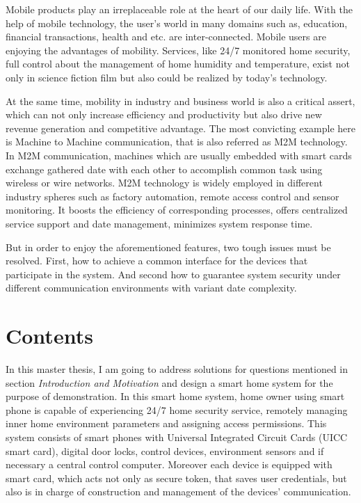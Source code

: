 \documentclass[]{llncs}
\begin{document}
Mobile products  play an irreplaceable role at the heart of our  daily life. With the help of mobile technology, the user's world in many domains such as, education, financial transactions, health and etc. are inter-connected. Mobile users are enjoying the advantages of mobility. Services, like 24/7 monitored home security, full control about the management of home humidity and temperature, exist not only in science fiction film but also could be realized by today's technology.

At the same time, mobility in industry and business world is also a critical  assert, which can not only increase efficiency and productivity but also drive new revenue generation and competitive advantage. The most convicting example here is Machine to Machine communication, that is also referred as M2M technology. In M2M communication, machines which are usually embedded with smart cards exchange gathered date with each other to accomplish common task using wireless or wire networks. M2M technology is widely employed in different industry spheres such as factory automation, remote access control and sensor monitoring. It boosts the efficiency of corresponding processes, offers centralized service support and date management, minimizes system response time.

But in order to enjoy the aforementioned features, two tough issues must be resolved. First, how to achieve a common interface for the devices that participate in the system.  And second how to guarantee system security under different communication environments with variant date complexity.
\section{Contents}
In this master thesis, I am going to address solutions for questions mentioned in  section \emph{Introduction and Motivation} and  design a smart home system for the purpose of demonstration. In this smart home system, home owner using smart phone is capable of experiencing 24/7 home security service, remotely managing inner home environment parameters and assigning access permissions. This system consists of smart phones with Universal Integrated Circuit Cards (UICC  smart card), digital door locks, control devices, environment sensors and if necessary a central control computer. Moreover each device is equipped with smart card, which acts  not only as secure token, that saves  user credentials, but also is in charge of  construction and management of the devices' communication.
\end{document}
